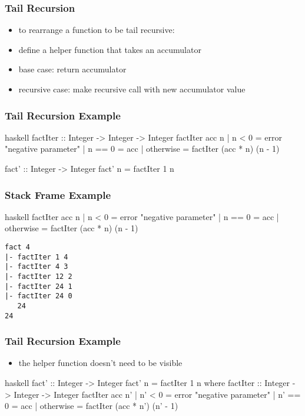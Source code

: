 \documentclass[dvipsnames]{beamer}
\theoremstyle{plain}
\begin{document}
\begin{frame}
  \frametitle{Tail Recursion}

  \begin{itemize}
    \item to rearrange a function to be tail recursive:

    \medskip
    \item define a helper function that takes an \alert{accumulator}
    \item base case: return accumulator
    \item recursive case: make recursive call with new accumulator value
  \end{itemize}
\end{frame}

\begin{frame}[fragile]
  \frametitle{Tail Recursion Example}

  \begin{exampleblock}{}
    \begin{pygments}{haskell}
factIter :: Integer -> Integer -> Integer
factIter acc n
  | n < 0     = error "negative parameter"
  | n == 0    = acc
  | otherwise = factIter (acc * n) (n - 1)

fact' :: Integer -> Integer
fact' n = factIter 1 n
    \end{pygments}
  \end{exampleblock}
\end{frame}

\begin{frame}[fragile]
  \frametitle{Stack Frame Example}

  \begin{exampleblock}{}
    \begin{pygments}{haskell}
factIter acc n
  | n < 0     = error "negative parameter"
  | n == 0    = acc
  | otherwise = factIter (acc * n) (n - 1)
    \end{pygments}

    \begin{verbatim}
fact 4
|- factIter 1 4
|- factIter 4 3
|- factIter 12 2
|- factIter 24 1
|- factIter 24 0
   24
24
    \end{verbatim}
  \end{exampleblock}
\end{frame}

\begin{frame}[fragile]
  \frametitle{Tail Recursion Example}

  \begin{itemize}
    \item the helper function doesn't need to be visible
  \end{itemize}

  \begin{exampleblock}{}
    \begin{pygments}{haskell}
fact' :: Integer -> Integer
fact' n = factIter 1 n
  where
    factIter :: Integer -> Integer -> Integer
    factIter acc n'
      | n' < 0    = error "negative parameter"
      | n' == 0   = acc
      | otherwise = factIter (acc * n') (n' - 1)
    \end{pygments}
  \end{exampleblock}
\end{frame}
\end{document}
